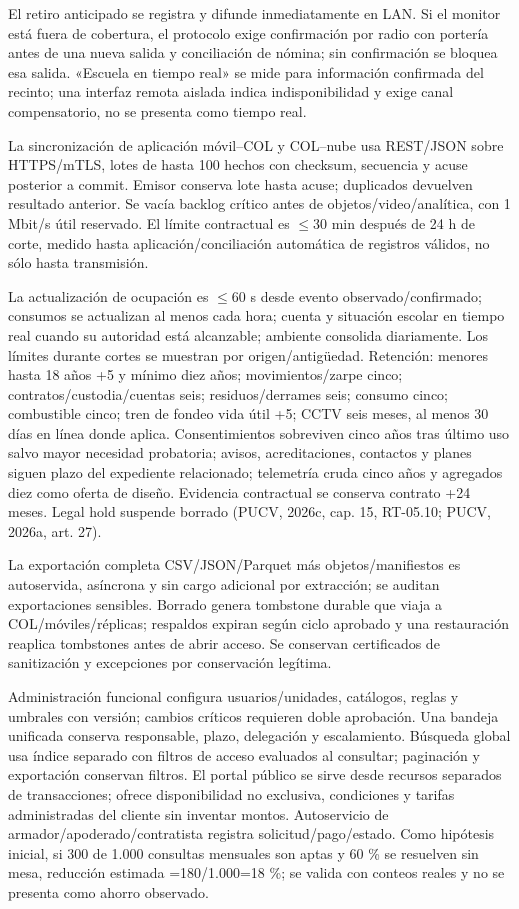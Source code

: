 \documentclass[11pt,letterpaper]{report}
\begin{document}
El retiro anticipado se registra y difunde inmediatamente en LAN. Si el monitor está fuera de cobertura, el protocolo exige confirmación por radio con portería antes de una nueva salida y conciliación de nómina; sin confirmación se bloquea esa salida. «Escuela en tiempo real» se mide para información confirmada del recinto; una interfaz remota aislada indica indisponibilidad y exige canal compensatorio, no se presenta como tiempo real.

La sincronización de aplicación móvil--COL y COL--nube usa REST/JSON sobre HTTPS/mTLS, lotes de hasta 100 hechos con checksum, secuencia y acuse posterior a commit. Emisor conserva lote hasta acuse; duplicados devuelven resultado anterior. Se vacía backlog crítico antes de objetos/video/analítica, con 1 Mbit/s útil reservado. El límite contractual es $\leq$30 min después de 24 h de corte, medido hasta aplicación/conciliación automática de registros válidos, no sólo hasta transmisión.

La actualización de ocupación es $\leq$60 s desde evento observado/confirmado; consumos se actualizan al menos cada hora; cuenta y situación escolar en tiempo real cuando su autoridad está alcanzable; ambiente consolida diariamente. Los límites durante cortes se muestran por origen/antigüedad. Retención: menores hasta 18 años +5 y mínimo diez años; movimientos/zarpe cinco; contratos/custodia/cuentas seis; residuos/derrames seis; consumo cinco; combustible cinco; tren de fondeo vida útil +5; CCTV seis meses, al menos 30 días en línea donde aplica. Consentimientos sobreviven cinco años tras último uso salvo mayor necesidad probatoria; avisos, acreditaciones, contactos y planes siguen plazo del expediente relacionado; telemetría cruda cinco años y agregados diez como oferta de diseño. Evidencia contractual se conserva contrato +24 meses. Legal hold suspende borrado (PUCV, 2026c, cap. 15, RT-05.10; PUCV, 2026a, art. 27).

La exportación completa CSV/JSON/Parquet más objetos/manifiestos es autoservida, asíncrona y sin cargo adicional por extracción; se auditan exportaciones sensibles. Borrado genera tombstone durable que viaja a COL/móviles/réplicas; respaldos expiran según ciclo aprobado y una restauración reaplica tombstones antes de abrir acceso. Se conservan certificados de sanitización y excepciones por conservación legítima.

Administración funcional configura usuarios/unidades, catálogos, reglas y umbrales con versión; cambios críticos requieren doble aprobación. Una bandeja unificada conserva responsable, plazo, delegación y escalamiento. Búsqueda global usa índice separado con filtros de acceso evaluados al consultar; paginación y exportación conservan filtros. El portal público se sirve desde recursos separados de transacciones; ofrece disponibilidad no exclusiva, condiciones y tarifas administradas del cliente sin inventar montos. Autoservicio de armador/apoderado/contratista registra solicitud/pago/estado. Como hipótesis inicial, si 300 de 1.000 consultas mensuales son aptas y 60 \% se resuelven sin mesa, reducción estimada =180/1.000=18 \%; se valida con conteos reales y no se presenta como ahorro observado.
\end{document}
